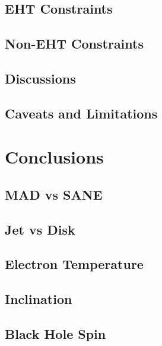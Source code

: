 \documentclass[twocolumn,twocolappendix,tighten,dvipsnames,linenumbers]{aastex63}
\begin{document}
\subsection{EHT Constraints}

\subsection{Non-EHT Constraints}

\subsection{Discussions}

\subsection{Caveats and Limitations}

\clearpage

\section{Conclusions}

\subsection{MAD vs SANE}

\subsection{Jet vs Disk}

\subsection{Electron Temperature}

\subsection{Inclination}

\subsection{Black Hole Spin}

\clearpage

 \software{\ehtim, \difmap, \smili, \dmc, \themis, \foci}
\end{document}
